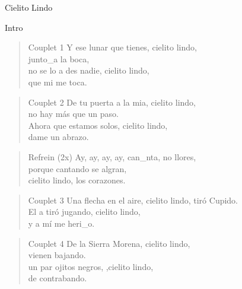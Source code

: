 \begin{song}[copla]{Cielito Lindo}
\begin{instrumental}{Intro}
\measure{}\measure{}\measure{}\measure{}\measure{}\measure{}
\measure{}\measure{}\measure{}\measure{}\measure{}\measure{}\measure{}
\measure{}\measure*{}
\end{instrumental}
\begin{verse}{Couplet 1}
Y ese lunar que tienes, cielito lindo,\\
junto\_a la boca,\hspace{5em}\\
\chord{}no se lo a des nadie, cielito lindo,\\
que mi me toca.\\
\end{verse}
\begin{verse}{Couplet 2}
De tu puerta a la mia, cielito lindo,\\
no hay más que un paso.\\
\chord{}Ahora que estamos solos, cielito lindo,\\
dame un abrazo.\\
\end{verse}
\begin{verse}{Refrein (2x)}
Ay, ay, ay, ay,\hspace{1em}\hspace{1em} can\_nta, no llores,\\
porque cantando se algran,\\
cielito lindo, los corazones.\\
\end{verse}
\begin{verse}{Couplet 3}
Una flecha en el aire, cielito lindo,
tiró Cupido.\\
\chord{}El a tiró jugando, cielito lindo,\\
y a mí me heri\_o.\\
\end{verse}
\begin{verse}{Couplet 4}
De la Sierra Morena, cielito lindo,\\
vienen bajando.\\
\chord{}un par ojitos negros, ,cielito lindo,\\
de contrabando.\\
\end{verse}
\end{song}

